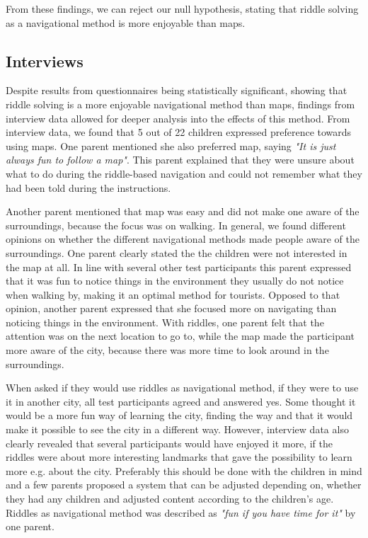 From these findings, we can reject our null hypothesis, stating that riddle solving as a navigational method is more enjoyable than maps.

\subsection{Interviews}
Despite results from questionnaires being statistically significant, showing that riddle solving is a more enjoyable navigational method than maps, findings from interview data allowed for deeper analysis into the effects of this method. From interview data, we found that 5 out of 22 children expressed preference towards using maps. One parent mentioned she also preferred map, saying \textit{"It is just always fun to follow a map"}. This parent explained that they were unsure about what to do during the riddle-based navigation and could not remember what they had been told during the instructions. 

Another parent mentioned that map was easy and did not make one aware of the surroundings, because the focus was on walking. In general, we found different opinions on whether the different navigational methods made people aware of the surroundings. One parent clearly stated the the children were not interested in the map at all. In line with several other test participants this parent expressed that it was fun to notice things in the environment they usually do not notice when walking by, making it an optimal method for tourists. Opposed to that opinion, another parent expressed that she focused more on navigating than noticing things in the environment. With riddles, one parent felt that the attention was on the next location to go to, while the map made the participant more aware of the city, because there was more time to look around in the surroundings. 

When asked if they would use riddles as navigational method, if they were to use it in another city, all test participants agreed and answered yes. Some thought it would be a more fun way of learning the city, finding the way and that it would make it possible to see the city in a different way. However, interview data also clearly revealed that several participants would have enjoyed it more, if the riddles were about more interesting landmarks that gave the possibility to learn more e.g. about the city. Preferably this should be done with the children in mind and a few parents proposed a system that can be adjusted depending on, whether they had any children and adjusted content according to the children’s age. Riddles as navigational method was described as \textit{"fun if you have time for it"} by one parent. 

